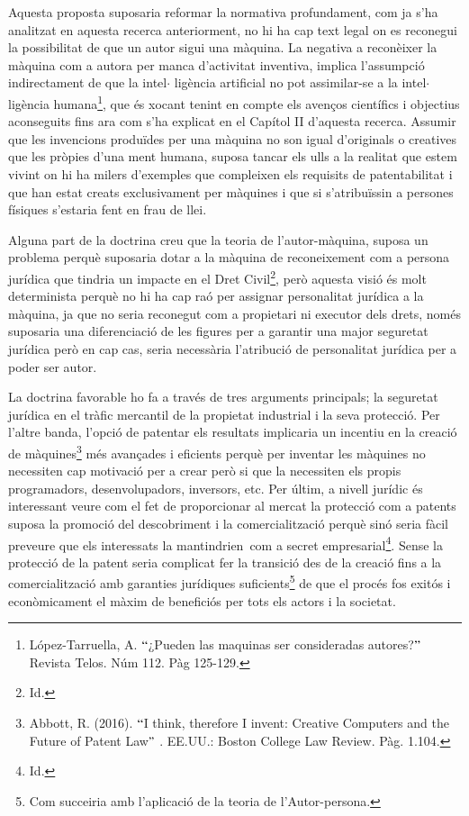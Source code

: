 \documentclass[12pt]{article}
\begin{document}
Aquesta proposta suposaria reformar la normativa profundament, com ja s’ha analitzat en aquesta recerca anteriorment, no hi ha cap text legal on es reconegui la possibilitat de que un autor sigui una màquina. La negativa a reconèixer la màquina com a autora per manca d’activitat inventiva, implica l’assumpció indirectament de que la intel$ \cdot $ ligència artificial no pot assimilar-se a la intel$ \cdot $ ligència humana\footnote{ López-Tarruella, A. $``$¿Pueden las maquinas ser consideradas autores?$"$  Revista Telos. Núm 112. Pàg 125-129. }, que és xocant tenint en compte els avenços científics i objectius aconseguits fins ara com s’ha explicat en el Capítol II d’aquesta recerca. Assumir que les invencions produïdes per una màquina no son igual d’originals o creatives que les pròpies d’una ment humana, suposa tancar els ulls a la realitat que estem vivint on hi ha milers d’exemples que compleixen els requisits de patentabilitat i que han estat creats exclusivament per màquines i que si s’atribuïssin a persones físiques s’estaria fent en frau de llei. \par


\vspace{\baselineskip}
Alguna part de la doctrina creu que la teoria de l’autor-màquina, suposa un problema perquè suposaria dotar a la màquina de reconeixement com a persona jurídica que tindria un impacte en el Dret Civil\footnote{ Id. }, però aquesta visió és molt determinista perquè no hi ha cap raó per assignar personalitat jurídica a la màquina, ja que no seria reconegut com a propietari ni executor dels drets, només suposaria una diferenciació de les figures per a garantir una major seguretat jurídica però en cap cas, seria necessària l’atribució de personalitat jurídica per a poder ser autor.  \par


\vspace{\baselineskip}
La doctrina favorable ho fa a través de tres arguments principals; la seguretat jurídica en el tràfic mercantil de la propietat industrial i la seva protecció. Per l’altre banda, l’opció de patentar els resultats implicaria un incentiu en la creació de màquines\footnote{ Abbott, R. (2016). $``$I think, therefore I invent: Creative Computers and the Future of Patent Law$"$ . EE.UU.: Boston College Law Review. Pàg. 1.104. } més avançades i eficients perquè per inventar les màquines no necessiten cap motivació per a crear però si que la necessiten els propis programadors, desenvolupadors, inversors, etc. Per últim, a nivell jurídic és interessant veure com el fet de proporcionar al mercat la protecció com a patents suposa la promoció del descobriment i la comercialització perquè sinó seria fàcil preveure que els interessats la mantindrien\  com a secret empresarial\footnote{ Id. }. Sense la protecció de la patent seria complicat fer la transició des de la creació fins a la comercialització amb garanties jurídiques suficients\footnote{ Com succeiria amb l’aplicació de la teoria de l’Autor-persona.  } de que el procés fos exitós i econòmicament el màxim de beneficiós per tots els actors i la societat. \par
\end{document}
